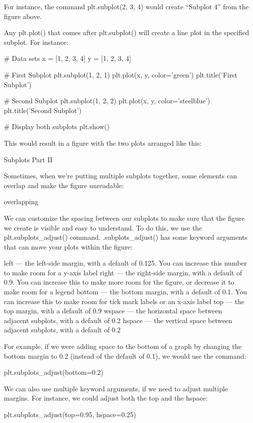 \documentclass{journal}
\begin{document}
For instance, the command plt.subplot(2, 3, 4) would create “Subplot 4” from the figure above.

Any plt.plot() that comes after plt.subplot() will create a line plot in the specified subplot. For instance:

# Data sets
x = [1, 2, 3, 4]
y = [1, 2, 3, 4]

# First Subplot
plt.subplot(1, 2, 1)
plt.plot(x, y, color='green')
plt.title('First Subplot')

# Second Subplot
plt.subplot(1, 2, 2)
plt.plot(x, y, color='steelblue')
plt.title('Second Subplot')

# Display both subplots
plt.show()

This would result in a figure with the two plots arranged like this:


Subplots Part II

Sometimes, when we’re putting multiple subplots together, some elements can overlap and make the figure unreadable:

overlapping

We can customize the spacing between our subplots to make sure that the figure we create is visible and easy to understand. To do this, we use the plt.subplots_adjust() command. .subplots_adjust() has some keyword arguments that can move your plots within the figure:

    left — the left-side margin, with a default of 0.125. You can increase this number to make room for a y-axis label
    right — the right-side margin, with a default of 0.9. You can increase this to make more room for the figure, or decrease it to make room for a legend
    bottom — the bottom margin, with a default of 0.1. You can increase this to make room for tick mark labels or an x-axis label
    top — the top margin, with a default of 0.9
    wspace — the horizontal space between adjacent subplots, with a default of 0.2
    hspace — the vertical space between adjacent subplots, with a default of 0.2

For example, if we were adding space to the bottom of a graph by changing the bottom margin to 0.2 (instead of the default of 0.1), we would use the command:

plt.subplots_adjust(bottom=0.2)

We can also use multiple keyword arguments, if we need to adjust multiple margins. For instance, we could adjust both the top and the hspace:

plt.subplots_adjust(top=0.95, hspace=0.25)
\end{document}
